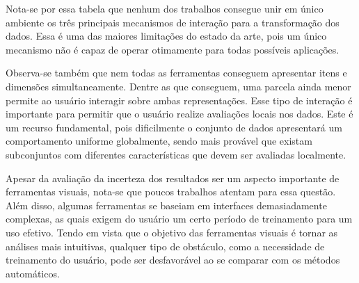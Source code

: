 Nota-se por essa tabela que nenhum dos trabalhos consegue
unir em único ambiente os três principais mecanismos de
interação para a transformação dos dados. Essa é uma das
maiores limitações do estado da arte, pois um único
mecanismo não é capaz de operar otimamente para todas
possíveis aplicações. 

Observa-se também que nem todas as ferramentas conseguem
apresentar itens e dimensões simultaneamente. Dentre as que
conseguem, uma parcela ainda menor permite ao usuário
interagir sobre ambas representações. Esse tipo de interação
é importante para permitir que o usuário realize avaliações
locais nos dados. Este é um recurso fundamental, pois
dificilmente o conjunto de dados apresentará um
comportamento uniforme globalmente, sendo mais provável que
existam subconjuntos com diferentes características que
devem ser avaliadas localmente.

Apesar da avaliação da incerteza dos resultados ser um aspecto importante 
de ferramentas visuais, nota-se que poucos trabalhos 
atentam para essa questão. Além disso, algumas ferramentas se
baseiam em interfaces demasiadamente complexas, as quais
exigem do usuário um certo período de treinamento para um
uso efetivo. Tendo em vista que o objetivo das ferramentas
visuais é tornar as análises mais intuitivas, qualquer tipo
de obstáculo, como a necessidade de treinamento do usuário,
pode ser desfavorável ao se comparar com os métodos
automáticos.

\newcommand{\redc}{\cellcolor{red!25}Não}
\newcommand{\greenc}{\cellcolor{green!25}Sim}

